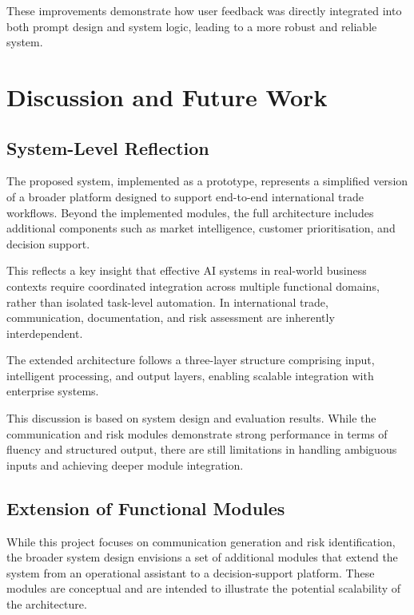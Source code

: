 \documentclass[12pt,a4paper]{report}
\begin{document}
These improvements demonstrate how user feedback was directly integrated into both prompt design and system logic, leading to a more robust and reliable system.

\chapter{Discussion and Future Work}

\section{System-Level Reflection}

The proposed system, implemented as a prototype, represents a simplified version of a broader platform designed to support end-to-end international trade workflows. Beyond the implemented modules, the full architecture includes additional components such as market intelligence, customer prioritisation, and decision support.

This reflects a key insight that effective AI systems in real-world business contexts require coordinated integration across multiple functional domains, rather than isolated task-level automation. In international trade, communication, documentation, and risk assessment are inherently interdependent.

The extended architecture follows a three-layer structure comprising input, intelligent processing, and output layers, enabling scalable integration with enterprise systems.

This discussion is based on system design and evaluation results. While the communication and risk modules demonstrate strong performance in terms of fluency and structured output, there are still limitations in handling ambiguous inputs and achieving deeper module integration.

\section{Extension of Functional Modules}

While this project focuses on communication generation and risk identification, the broader system design envisions a set of additional modules that extend the system from an operational assistant to a decision-support platform. These modules are conceptual and are intended to illustrate the potential scalability of the architecture.
\end{document}
